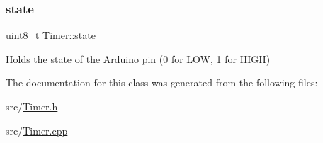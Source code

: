 \subsubsection{\texorpdfstring{state}{state}}
{\footnotesize\ttfamily uint8\+\_\+t Timer\+::state\hspace{0.3cm}{\ttfamily [protected]}}

Holds the state of the Arduino pin (0 for L\+OW, 1 for H\+I\+GH) 

The documentation for this class was generated from the following files\+:\begin{DoxyCompactItemize}
\item 
src/\hyperlink{_timer_8h}{Timer.\+h}\item 
src/\hyperlink{_timer_8cpp}{Timer.\+cpp}\end{DoxyCompactItemize}

